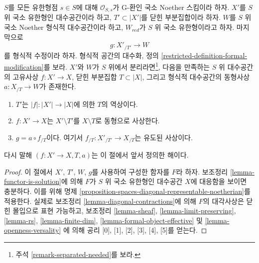 \begin{theorem}
\label{theorem-contractions}
\begin{reference}
\cite[Theorem 3.1]{ArtinII}
\end{reference}
$S$를 모든 유한형점 $s \in S$에 대해 $\mathcal{O}_{S, s}$가
G-환인 국소 Noether 스킴이라 하자. $X'$를 $S$ 위 국소 유한형인
대수공간이라 하고, $T' \subset |X'|$를 닫힌 부분집합이라 하자.
$W$를 $S$ 위 국소 Noether 형식적 대수공간이라 하고,
$W_{red}$가 $S$ 위 국소 유한형이라고 하자. 마지막으로
$$
g : X'_{/T'} \longrightarrow W
$$
를 형식적 수정이라 하자. 형식적 공간의 대수화, 정의
\ref{restricted-definition-formal-modification}를 보라.
$X'$와 $W$가 $S$ 위에서 분리라면\footnote{주석
\ref{remark-separated-needed}를 보라.}, 다음을 만족하는
$S$ 위 대수공간의 고유사상 $f : X' \to X$, 닫힌 부분집합
$T \subset |X|$, 그리고 형식적 대수공간의 동형사상
$a : X_{/T} \to W$가 존재한다.
\begin{enumerate}
\item $T'$는 $|f| : |X'| \to |X|$에 의한 $T$의 역상이다.
\item $f : X' \to X$는 $X' \setminus T'$를 $X \setminus T$로
동형으로 사상한다.
\item $g = a \circ f_{/T}$이다. 여기서
$f_{/T} : X'_{/T'} \to X_{/T}$는 유도된 사상이다.
\end{enumerate}
다시 말해 $(f : X' \to X, T, a)$는 이 절에서 앞서 정의한 해이다.
\end{theorem}

\begin{proof}
이 절에서 $X'$, $T'$, $W$, $g$를 사용하여 구성한 함자를 $F$라 하자.
보조정리 \ref{lemma-functor-is-solution}에 의해 $F$가 $S$ 위
국소 유한형인 대수공간 $X$에 대응함을 보이면 충분하다.
이를 위해 명제 \ref{proposition-spaces-diagonal-representable-noetherian}를
적용한다. 실제로 보조정리 \ref{lemma-diagonal-contractions}에 의해
$F$의 대각사상은 닫힌 몰입으로 표현 가능하고, 보조정리
\ref{lemma-sheaf}, \ref{lemma-limit-preserving},
\ref{lemma-rs}, \ref{lemma-finite-dim},
\ref{lemma-formal-object-effective} 및 \ref{lemma-openness-versality}
에 의해 공리 [0], [1], [2], [3], [4], [5]를 얻는다.
\end{proof}

